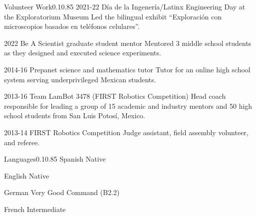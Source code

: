 \documentclass{federico_cv}
\begin{document}
\begin{tblSection}{Volunteer Work}{0.1}{0.85}
\job
{2021-22}
{Día de la Ingenería/Latinx Engineering Day at the Exploratorium Museum}
{Led the bilingual exhibit ``Exploración con microscopios basados en teléfonos celulares''.}

\leftbfrightsinglenobreak
{2022}
{Be A Scientist graduate student mentor}
{Mentored 3 middle school students as they designed and executed science experiments.}

\job
{2014-16}
{Prepanet science and mathematics tutor}
{Tutor for an online high school system serving underprivileged Mexican students.}

\job
{2013-16}
{Team LamBot 3478 (FIRST Robotics Competition)}
{Head coach responsible for leading a group of 15 academic and industry mentors and 50 high school students from San Luis Potosí, Mexico.}

\job
{2013-14}
{FIRST Robotics Competition}
{Judge assistant, field assembly volunteer, and referee.}

\end{tblSection}

\begin{tblSection}{Languages}{0.1}{0.85}
\leftrightsingletight
{Spanish}
{Native}

\leftrightsingletight
{English}
{Native}

\leftrightsingletight
{German}
{Very Good Command (B2.2)}

\leftrightsingletight
{French}
{Intermediate}
\end{tblSection}
\end{document}
